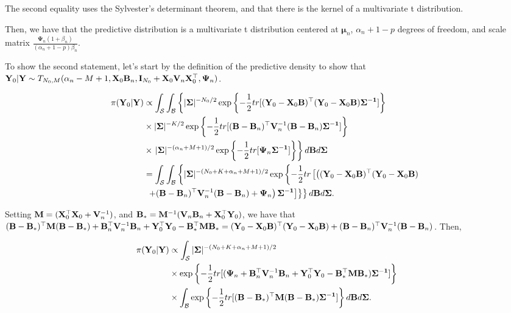 \begin{enumerate}[leftmargin=*]
The second equality uses the Sylvester's determinant theorem, and that there is the kernel of a multivariate t distribution.

Then, we have that the predictive distribution is a multivariate t distribution centered at $\bm{\mu}_n$, $\alpha_n+1-p$ degrees of freedom, and scale matrix $\frac{\mathbf{\Psi}_n(1+\beta_n)}{(\alpha_n+1-p)\beta_n}$.

To show the second statement, let's start by the definition of the predictive density to show that ${\bf{Y}}_0|{\bf{Y}}\sim T_{N_0,M}(\alpha_n-M+1,{\bf{X}}_0{\bf{B}}_n,{\bf{I}}_{N_0}+{\bf{X}}_0{\bf{V}}_n{\bf{X}}_0^{\top},{\bf{\Psi}}_n)$.

\begin{align*}
	\pi({\bf{Y}}_0|{\bf{Y}})&\propto\int_{\mathcal{S}}\int_{\mathcal{B}}\left\{ |{\bf{\Sigma}}|^{-N_0/2}\exp\left\{-\frac{1}{2}tr[({\bf{Y}}_0-{\bf{X}}_0{\bf{B}})^{\top}({\bf{Y}}_0-{\bf{X}}_0{\bf{B}}){\bf{\Sigma}^{-1}}]\right\}\right.\\
	&\times |{\bf{\Sigma}}|^{-K/2}\exp\left\{-\frac{1}{2}tr[({\bf{B}}-{\bf{B}}_n)^{\top}{\bf{V}}_n^{-1}({\bf{B}}-{\bf{B}}_n){\bf{\Sigma}^{-1}}]\right\}\\
	&\times\left. |{\bf{\Sigma}}|^{-(\alpha_n+M+1)/2}\exp\left\{-\frac{1}{2}tr[{\bf{\Psi}}_n{\bf{\Sigma}^{-1}}]\right\}\right\}d{\bf{B}}d{\bf{\Sigma}}\\
	&=\int_{\mathcal{S}}\int_{\mathcal{B}}\left\{ |{\bf{\Sigma}}|^{-(N_0+K+\alpha_n+M+1)/2}\exp\left\{-\frac{1}{2}tr\left[\left(({\bf{Y}}_0-{\bf{X}}_0{\bf{B}})^{\top}({\bf{Y}}_0-{\bf{X}}_0{\bf{B}})\right.\right.\right.\right.\\
	&\left.\left.\left.\left.+({\bf{B}}-{\bf{B}}_n)^{\top}{\bf{V}}_n^{-1}({\bf{B}}-{\bf{B}}_n)+{\bf{\Psi}}_n\right){\bf{\Sigma}^{-1}}\right]\right\}\right\}d{\bf{B}}d{\bf{\Sigma}}.	 
\end{align*}

Setting ${\bf{M}}=({\bf{X}}_0^{\top}{\bf{X}}_0+{\bf{V}}_n^{-1})$, and ${\bf{B}}_{*}={\bf{M}}^{-1}({\bf{V}}_n{\bf{B}}_n+{\bf{X}}_0^{\top}{\bf{Y}}_0)$, we have that $({\bf{B}}-{\bf{B}}_*)^{\top}{\bf{M}}({\bf{B}}-{\bf{B}}_*)+{\bf{B}}_n^{\top}{\bf{V}}_n^{-1}{\bf{B}}_n+{\bf{Y}}_0^{\top}{\bf{Y}}_0-{\bf{B}}_*^{\top}{\bf{M}}{\bf{B}}_*=({\bf{Y}}_0-{\bf{X}}_0{\bf{B}})^{\top}({\bf{Y}}_0-{\bf{X}}_0{\bf{B}})+({\bf{B}}-{\bf{B}}_n)^{\top}{\bf{V}}_n^{-1}({\bf{B}}-{\bf{B}}_n)$. Then,

\begin{align*}
	\pi({\bf{Y}}_0|{\bf{Y}})&\propto \int_{\mathcal{S}}|{\bf{\Sigma}}|^{-(N_0+K+\alpha_n+M+1)/2}\\
	&\times \exp\left\{-\frac{1}{2}tr[({\bf{\Psi}}_n+{\bf{B}}_n^{\top}{\bf{V}}_n^{-1}{\bf{B}}_n+{\bf{Y}}_0^{\top}{\bf{Y}}_0-{\bf{B}}_*^{\top}{\bf{M}}{\bf{B}}_*){\bf{\Sigma}^{-1}}]\right\}\\
	&\times\int_{\mathcal{B}}\exp\left\{-\frac{1}{2}tr[({\bf{B}}-{\bf{B}}_*)^{\top}{\bf{M}}({\bf{B}}-{\bf{B}}_*){\bf{\Sigma}^{-1}}]\right\}d{\bf{B}}d{\bf{\Sigma}}.
\end{align*} 


\end{enumerate}
